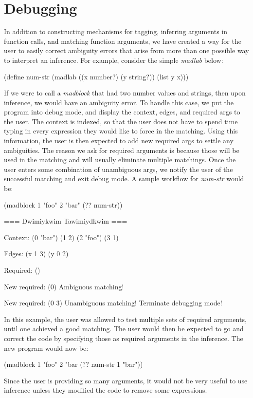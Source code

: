 \documentclass[11pt]{article}
\begin{document}
\section{Debugging}\label{debugging}

In addition to constructing mechanisms for tagging,
inferring arguments in function calls, and matching function arguments,
we have created a way for the user to easily correct ambiguity errors
that arise from more than one possible way to interpret an inference.
For example, consider the simple \textit{madlab} below:
\begin{verbbox}
(define num-str
 (madlab ((x number?) (y string?))
         (list y x)))
\end{verbbox}
\begin{center}\theverbbox\end{center}
If we were to call a \textit{madblock} that had two number values and strings,
then upon inference, we would have an ambiguity error.
To handle this case, we put the program into debug mode,
and display the context, edges, and required args to the user.
The context is indexed, so that the user does not have to spend time
typing in every expression they would like to force in the matching.
Using this information, the user is then expected to add new required args
to settle any ambiguities.
The reason we ask for required arguments is because those will be used
in the matching and will usually eliminate multiple matchings.
Once the user enters some combination of unambiguous args,
we notify the user of the successful matching and exit debug mode.
A sample workflow for \textit{num-str} would be:
\begin{verbbox}
(madblock
 1
 "foo"
 2
 "bar"
 (?? num-str))

=== Dwimiykwim Tawimiydkwim ===

Context:
(0 "bar")
(1 2)
(2 "foo")
(3 1)

Edges:
(x 1 3)
(y 0 2)

Required:
()

New required:
(0)
Ambiguous matching!

New required:
(0 3)
Unambiguous matching! Terminate debugging mode!
\end{verbbox}
\begin{center}\theverbbox\end{center}
In this example, the user was allowed to test multiple sets of required
arguments, until one achieved a good matching.
The user would then be expected to go and correct the code
by specifying those as required arguments in the inference.
The new program would now be:
\begin{verbbox}
(madblock
 1
 "foo"
 2
 "bar
 (?? num-str 1 "bar"))
\end{verbbox}
\begin{center}\theverbbox\end{center}
Since the user is providing so many arguments, it would not be very useful
to use inference unless they modified the code to remove some expressions.
\end{document}
